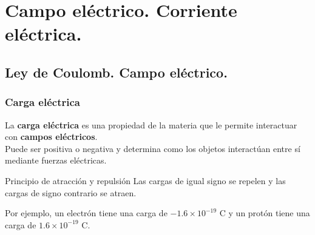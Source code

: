 \section{Campo eléctrico. Corriente eléctrica.}
\subsection{Ley de Coulomb. Campo eléctrico.}
\subsubsection{Carga eléctrica}
La \textbf{carga eléctrica} es una propiedad de la materia que le permite interactuar con \textbf{campos eléctricos}.\\ Puede ser positiva o negativa y determina como los objetos interactúan entre sí mediante fuerzas eléctricas.

\begin{teorema}{Principio de atracción y repulsión}
    Las cargas de igual signo se repelen y las cargas de signo contrario se atraen.
\end{teorema}
Por ejemplo, un electrón tiene una carga de $-1.6 \times 10^{-19}$ C y un protón tiene una carga de $1.6 \times 10^{-19}$ C.

\centering
\def\a{2.5}
\def\R{0.33}

